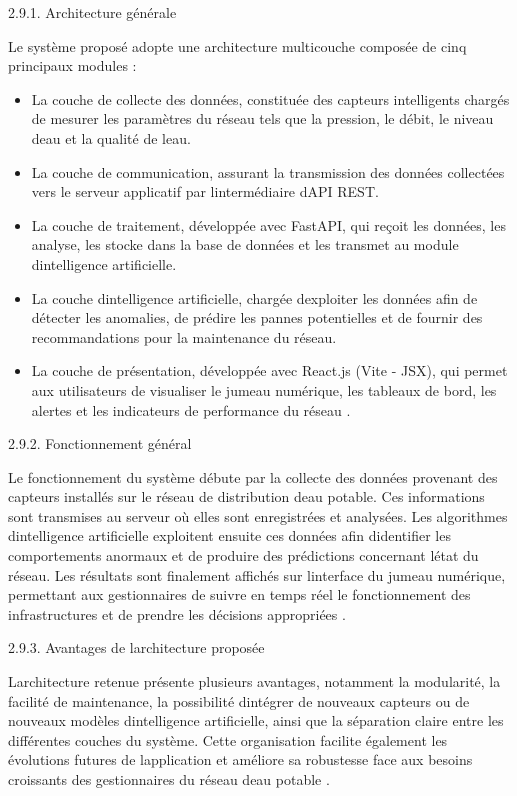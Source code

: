 \documentclass[12pt,a4paper,oneside]{report}
\begin{document}
2.9.1. Architecture générale

Le système proposé adopte une architecture multicouche composée de cinq
principaux modules :

\begin{itemize}
\item
  La couche de collecte des données, constituée des capteurs
  intelligents chargés de mesurer les paramètres du réseau tels que la
  pression, le débit, le niveau d\textquotesingle eau et la qualité de
  l\textquotesingle eau.
\item
  La couche de communication, assurant la transmission des données
  collectées vers le serveur applicatif par
  l\textquotesingle intermédiaire d\textquotesingle API REST.
\item
  La couche de traitement, développée avec FastAPI, qui reçoit les
  données, les analyse, les stocke dans la base de données et les
  transmet au module d\textquotesingle intelligence artificielle.
\item
  La couche d\textquotesingle intelligence artificielle, chargée
  d\textquotesingle exploiter les données afin de détecter les
  anomalies, de prédire les pannes potentielles et de fournir des
  recommandations pour la maintenance du réseau.
\item
  La couche de présentation, développée avec React.js (Vite - JSX), qui
  permet aux utilisateurs de visualiser le jumeau numérique, les
  tableaux de bord, les alertes et les indicateurs de performance du
  réseau \cite{ref106}.
\end{itemize}

2.9.2. Fonctionnement général

Le fonctionnement du système débute par la collecte des données
provenant des capteurs installés sur le réseau de distribution
d\textquotesingle eau potable. Ces informations sont transmises au
serveur où elles sont enregistrées et analysées. Les algorithmes
d\textquotesingle intelligence artificielle exploitent ensuite ces
données afin d\textquotesingle identifier les comportements anormaux et
de produire des prédictions concernant l\textquotesingle état du réseau.
Les résultats sont finalement affichés sur l\textquotesingle interface
du jumeau numérique, permettant aux gestionnaires de suivre en temps
réel le fonctionnement des infrastructures et de prendre les décisions
appropriées \cite{ref116}.

2.9.3. Avantages de l\textquotesingle architecture proposée

L\textquotesingle architecture retenue présente plusieurs avantages,
notamment la modularité, la facilité de maintenance, la possibilité
d\textquotesingle intégrer de nouveaux capteurs ou de nouveaux modèles
d\textquotesingle intelligence artificielle, ainsi que la séparation
claire entre les différentes couches du système. Cette organisation
facilite également les évolutions futures de
l\textquotesingle application et améliore sa robustesse face aux besoins
croissants des gestionnaires du réseau d\textquotesingle eau potable
\cite{ref126}.
\end{document}
